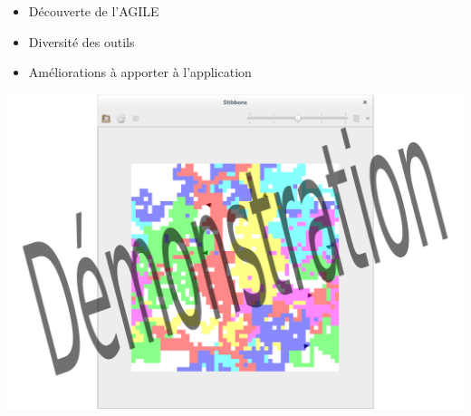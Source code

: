 \begin{frame}
\begin{itemize}
\item Découverte de l'AGILE
\item Diversité des outils
\item Améliorations à apporter à l'application
\end{itemize}
\end{frame}

\begin{frame}
\includegraphics[scale=0.3]{doc/Presentation/image/demo.pdf}
\end{frame}
